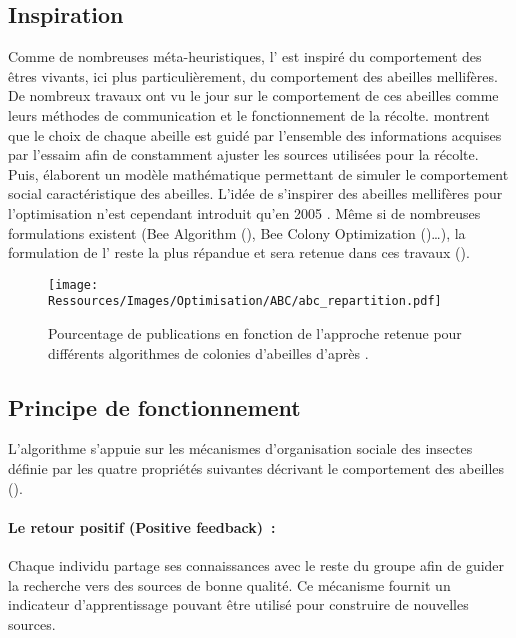 \subsection{Inspiration} %
\label{sub:inspiration}
Comme de nombreuses méta-heuristiques, l’ est inspiré du comportement des êtres
vivants, ici plus particulièrement, du comportement des abeilles mellifères. De
nombreux travaux ont vu le jour sur le comportement de ces abeilles comme leurs méthodes
de communication et le fonctionnement de la récolte. \textcite{Visscher19821790} montrent
que le choix de chaque abeille est guidé par l’ensemble des informations acquises
par l’essaim afin de constamment ajuster les sources utilisées pour la récolte.
Puis, \textcite{Camazine1991547} élaborent un modèle mathématique permettant de simuler
le comportement social caractéristique des abeilles.
L’idée de s’inspirer des abeilles mellifères pour l’optimisation n’est cependant introduit
qu’en 2005 \parencite{Karaboga2005}. Même si de nombreuses formulations existent (Bee
Algorithm (), Bee Colony Optimization ()\dots), la formulation de
l’ reste la plus répandue et sera retenue dans ces travaux ().

\begin{figure}
    \centering
    \texttt{[image: Ressources/Images/Optimisation/ABC/abc\_repartition.pdf]}
    \caption[Popularité de l’algorithme de colonies d’abeilles ]
            {Pourcentage de publications en fonction de l’approche retenue pour différents
             algorithmes de colonies d’abeilles d’après \cite{Karaboga201221}.}
    \label{fig:abc_repartition}
\end{figure}


\subsection{Principe de fonctionnement} %
\label{sub:principe_de_fonctionnement}
L’algorithme s’appuie sur les mécanismes d’organisation sociale des insectes
\parencite{Bonabeau1999} définie par les quatre propriétés suivantes
décrivant le comportement des abeilles ().

\paragraph{Le retour positif (Positive feedback)~:} %
\label{par:positive_feedback}
Chaque individu partage ses connaissances avec le reste du groupe afin de guider
la recherche vers des sources de bonne qualité. Ce mécanisme fournit un indicateur
d’apprentissage pouvant être utilisé pour construire de nouvelles sources.

